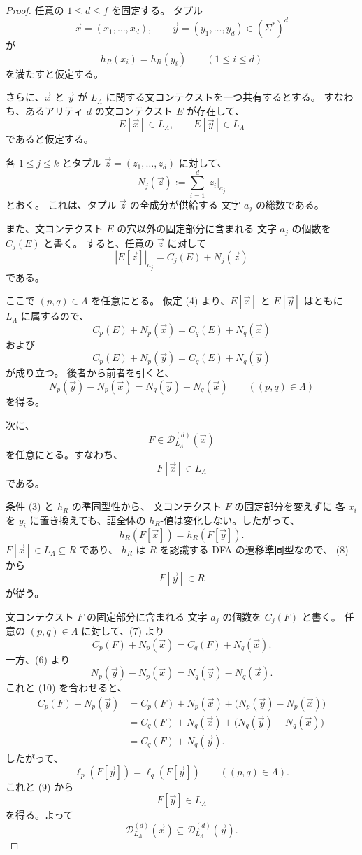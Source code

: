 \documentclass[11pt,a4paper]{ltjsarticle}
\theoremstyle{remark}
\newcommand{\D}{\mathcal{D}}
\newcommand{\tuple}[1]{\vec{#1}}
\begin{document}
\begin{proof}
任意の \(1\le d\le f\) を固定する。
タプル
\[
  \tuple x=(x_1,\ldots,x_d),
  \qquad
  \tuple y=(y_1,\ldots,y_d)
  \in(\Sigma^*)^d
\]
が
\[
  h_R(x_i)=h_R(y_i)
  \qquad(1\le i\le d)
  \tag{3}
\]
を満たすと仮定する。

さらに、\(\tuple x\) と \(\tuple y\) が
\(L_\Lambda\) に関する文コンテクストを一つ共有するとする。
すなわち、あるアリティ \(d\) の文コンテクスト \(E\) が存在して、
\[
  E[\tuple x]\in L_\Lambda,
  \qquad
  E[\tuple y]\in L_\Lambda
  \tag{4}
\]
であると仮定する。

各 \(1\le j\le k\) とタプル
\(\tuple z=(z_1,\ldots,z_d)\) に対して、
\[
  N_j(\tuple z)
  :=
  \sum_{i=1}^d |z_i|_{a_j}
\]
とおく。
これは、タプル \(\tuple z\) の全成分が供給する
文字 \(a_j\) の総数である。

また、文コンテクスト \(E\) の穴以外の固定部分に含まれる
文字 \(a_j\) の個数を \(C_j(E)\) と書く。
すると、任意の \(\tuple z\) に対して
\[
  |E[\tuple z]|_{a_j}
  =
  C_j(E)+N_j(\tuple z)
  \tag{5}
\]
である。

ここで \((p,q)\in\Lambda\) を任意にとる。
仮定 (4) より、\(E[\tuple x]\) と \(E[\tuple y]\) はともに
\(L_\Lambda\) に属するので、
\[
  C_p(E)+N_p(\tuple x)
  =
  C_q(E)+N_q(\tuple x)
\]
および
\[
  C_p(E)+N_p(\tuple y)
  =
  C_q(E)+N_q(\tuple y)
\]
が成り立つ。
後者から前者を引くと、
\[
  N_p(\tuple y)-N_p(\tuple x)
  =
  N_q(\tuple y)-N_q(\tuple x)
  \qquad
  ((p,q)\in\Lambda)
  \tag{6}
\]
を得る。

次に、
\[
  F\in\D_{L_\Lambda}^{(d)}(\tuple x)
\]
を任意にとる。すなわち、
\[
  F[\tuple x]\in L_\Lambda
  \tag{7}
\]
である。

条件 (3) と \(h_R\) の準同型性から、
文コンテクスト \(F\) の固定部分を変えずに
各 \(x_i\) を \(y_i\) に置き換えても、語全体の
\(h_R\)-値は変化しない。したがって、
\[
  h_R(F[\tuple x])
  =
  h_R(F[\tuple y]).
  \tag{8}
\]
\(F[\tuple x]\in L_\Lambda\subseteq R\) であり、
\(h_R\) は \(R\) を認識する DFA の遷移準同型なので、
(8) から
\[
  F[\tuple y]\in R
  \tag{9}
\]
が従う。

文コンテクスト \(F\) の固定部分に含まれる
文字 \(a_j\) の個数を \(C_j(F)\) と書く。
任意の \((p,q)\in\Lambda\) に対して、(7) より
\[
  C_p(F)+N_p(\tuple x)
  =
  C_q(F)+N_q(\tuple x).
  \tag{10}
\]
一方、(6) より
\[
  N_p(\tuple y)-N_p(\tuple x)
  =
  N_q(\tuple y)-N_q(\tuple x).
\]
これと (10) を合わせると、
\[
\begin{aligned}
  C_p(F)+N_p(\tuple y)
  &=
  C_p(F)+N_p(\tuple x)
    +\bigl(N_p(\tuple y)-N_p(\tuple x)\bigr)
  \\
  &=
  C_q(F)+N_q(\tuple x)
    +\bigl(N_q(\tuple y)-N_q(\tuple x)\bigr)
  \\
  &=
  C_q(F)+N_q(\tuple y).
\end{aligned}
\]
したがって、
\[
  \ell_p(F[\tuple y])
  =
  \ell_q(F[\tuple y])
  \qquad
  ((p,q)\in\Lambda).
\]
これと (9) から
\[
  F[\tuple y]\in L_\Lambda
\]
を得る。よって
\[
  \D_{L_\Lambda}^{(d)}(\tuple x)
  \subseteq
  \D_{L_\Lambda}^{(d)}(\tuple y).
\]


\end{proof}
\end{document}

